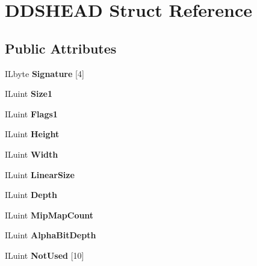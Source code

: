 \hypertarget{structDDSHEAD}{}\section{D\+D\+S\+H\+E\+AD Struct Reference}
\label{structDDSHEAD}
\subsection*{Public Attributes}
\begin{DoxyCompactItemize}
\item 
\mbox{\label{structDDSHEAD_acdcd77b407ddb8981bf5f0a27319f40f}} 
I\+Lbyte {\bfseries Signature} \mbox{[}4\mbox{]}
\item 
\mbox{\label{structDDSHEAD_a318b23d5dba638862d80e5e46624a096}} 
I\+Luint {\bfseries Size1}
\item 
\mbox{\label{structDDSHEAD_ac0d5f86ed41c77640cf7161d0d2674f7}} 
I\+Luint {\bfseries Flags1}
\item 
\mbox{\label{structDDSHEAD_a574b6f0bfa95bb5cca7bee6e903ea7fa}} 
I\+Luint {\bfseries Height}
\item 
\mbox{\label{structDDSHEAD_a5a91cf53282136fb6932a6bb6ab2a767}} 
I\+Luint {\bfseries Width}
\item 
\mbox{\label{structDDSHEAD_a8c1c14a693084a8c2fdeeccfedcaed95}} 
I\+Luint {\bfseries Linear\+Size}
\item 
\mbox{\label{structDDSHEAD_a26c2a5979754e4f8514a38e5fd909608}} 
I\+Luint {\bfseries Depth}
\item 
\mbox{\label{structDDSHEAD_a898619a23cdb3b43a04898ae7f0161ac}} 
I\+Luint {\bfseries Mip\+Map\+Count}
\item 
\mbox{\label{structDDSHEAD_aac444e9516ed803bfb76a20c4e85fe75}} 
I\+Luint {\bfseries Alpha\+Bit\+Depth}
\item 
\mbox{\label{structDDSHEAD_aa75e034db6ec0d0145f83b4da526c542}} 
I\+Luint {\bfseries Not\+Used} \mbox{[}10\mbox{]}

\end{DoxyCompactItemize}
